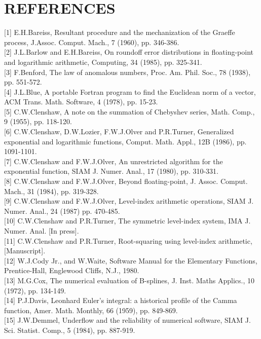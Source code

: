 \documentclass[10pt]{article}
\begin{document}
\section*{REFERENCES}
[1] E.H.Bareiss, Resultant procedure and the mechanization of the Graeffe process, J.Assoc. Comput. Mach., 7 (1960), pp. 346-386.\\[0pt]
[2] J.L.Barlow and E.H.Bareiss, On roundoff error distributions in floating-point and logarithmic arithmetic, Computing, 34 (1985), pp. 325-341.\\[0pt]
[3] F.Benford, The law of anomalous numbers, Proc. Am. Phil. Soc., 78 (1938), pp. 551-572.\\[0pt]
[4] J.L.Blue, A portable Fortran program to find the Euclidean norm of a vector, ACM Trans. Math. Software, 4 (1978), pp. 15-23.\\[0pt]
[5] C.W.Clenshaw, A note on the summation of Chebyshev series, Math. Comp., 9 (1955), pp. 118-120.\\[0pt]
[6] C.W.Clenshaw, D.W.Lozier, F.W.J.Olver and P.R.Turner, Generalized exponential and logarithmic functions, Comput. Math. Appl., 12B (1986), pp. 1091-1101.\\[0pt]
[7] C.W.Clenshaw and F.W.J.Olver, An unrestricted algorithm for the exponential function, SIAM J. Numer. Anal., 17 (1980), pp. 310-331.\\[0pt]
[8] C.W.Clenshaw and F.W.J.Olver, Beyond floating-point, J. Assoc. Comput. Mach., 31 (1984), pp. 319-328.\\[0pt]
[9] C.W.Clenshaw and F.W.J.Olver, Level-index arithmetic operations, SIAM J. Numer. Anal., 24 (1987) pp. 470-485.\\[0pt]
[10] C.W.Clenshaw and P.R.Turner, The symmetric level-index system, IMA J. Numer. Anal. [In press].\\[0pt]
[11] C.W.Clenshaw and P.R.Turner, Root-squaring using level-index arithmetic, [Manuscript].\\[0pt]
[12] W.J.Cody Jr., and W.Waite, Software Manual for the Elementary Functions, Prentice-Hall, Englewood Cliffs, N.J., 1980.\\[0pt]
[13] M.G.Cox, The numerical evaluation of B-splines, J. Inst. Maths Applics., 10 (1972), pp. 134-149.\\[0pt]
[14] P.J.Davis, Leonhard Euler's integral: a historical profile of the Camma function, Amer. Math. Monthly, 66 (1959), pp. 849-869.\\[0pt]
[15] J.W.Demmel, Underflow and the reliability of numerical software, SIAM J. Sci. Statist. Comp., 5 (1984), pp. 887-919.\\[0pt]
\end{document}
